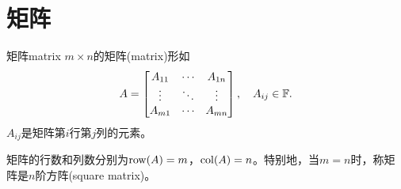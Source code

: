 
\section{矩阵}
\begin{definition}{矩阵}{matrix}
    $m\times n$的矩阵(matrix)形如
    \[
        A=\begin{bmatrix}
            A_{11}&\cdots&A_{1n}\\
            \vdots&\ddots&\vdots\\
            A_{m1}&\cdots&A_{mn}
        \end{bmatrix},\quad A_{ij}\in\mathbb F.
    \]
    $A_{ij}$是矩阵第$i$行第$j$列的元素。
    
    矩阵的行数和列数分别为$\operatorname{row}(A)=m$，$\operatorname{col}(A)=n$。特别地，当$m=n$时，称矩阵是$n$阶方阵(square matrix)。
\end{definition}

